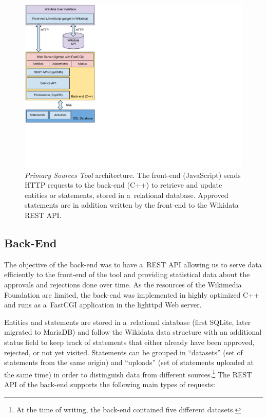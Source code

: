 \documentclass{sig-alternate-2013}
\begin{document}
\begin{figure}[!htbp]
    \centering
    \includegraphics[width=.65\columnwidth]{img/architecture.pdf}
    \caption{\emph{Primary Sources Tool} architecture. The front-end (JavaScript) sends
      HTTP requests to the back-end (C++) to retrieve and update entities or
      statements, stored in a~relational database. Approved statements are in
      addition written by the front-end to the Wikidata REST API.}
    \label{fig:architecture}
\end{figure}

\subsection{Back-End}

The objective of the back-end was to have a~REST API allowing us
to serve data efficiently to the front-end of the tool and
providing statistical data about the approvals and rejections done over time.
As the resources of the Wikimedia Foundation are limited,
the back-end was implemented in highly optimized C++
and runs as a~FastCGI application in the lighttpd Web server.

Entities and statements are stored in a~relational database
(first SQLite, later migrated to MariaDB)
and follow the Wikidata data structure with an additional status field
to keep track of statements that either already have been approved, rejected,
or not yet visited.
Statements can be grouped in ``datasets'' (set of statements from the same origin)
and ``uploads'' (set of statements uploaded at the same time) in order to
distinguish data from different sources.\footnote{At the time of writing,
the back-end contained five different datasets.}
The REST API of the back-end supports the following main types of requests:
\end{document}
